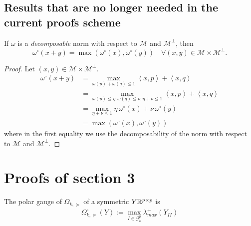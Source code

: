 \documentclass{article}
\begin{document}



\subsection{Results that are no longer needed in the current proofs scheme}
\begin{lemma}
\label{lem:dual_dec}
If $\omega$ is a \emph{decomposable} norm with respect to $\mathcal{M}$ and $\mathcal{M}^{\perp}$, then
$$
\omega^{\circ}(x+y)=\max(\omega^{\circ}(x),\omega^{\circ}(y))  \quad \forall (x,y)\in\mathcal{M}\times\mathcal{M}^{\perp}.
$$
\end{lemma}
\begin{proof}
Let $(x,y)\in\mathcal{M}\times\mathcal{M}^{\perp}$. 
\begin{align*}
\omega^{\circ}(x+y) 
&= \max_{\omega(p)+\omega(q)\leq 1} \left\langle x,p\right\rangle + \left\langle x,q\right\rangle  \\
&= \max_{\omega(p)\leq \eta, \omega(q)\leq \nu, \eta+ \nu \leq 1} \left\langle x,p\right\rangle + \left\langle x,q\right\rangle  \\
&= \max_{\eta+ \nu \leq 1} \eta\, \omega^{\circ}(x)+\nu\, \omega^{\circ}(y)\\
&= \max(\omega^{\circ}(x),\omega^{\circ}(y))
\end{align*}
where in the first equality we use the decomposability of the norm  with respect to $\mathcal{M}$ and $\mathcal{M}^{\perp}$.
\end{proof}


\newpage
\section{Proofs of section 3}

\begin{lemma} The polar gauge of $\Omega_{k,\succeq}$ of a symmetric $Y\mathbb{R}^{p\times p}$ is
\begin{align}
\Omega_{k,\succeq}^{\circ}(Y):= \max_{I\in\mathcal{G}^p_k}\lambda^{+}_{max}(Y_{II})
\end{align}
\end{lemma}
\end{document}
